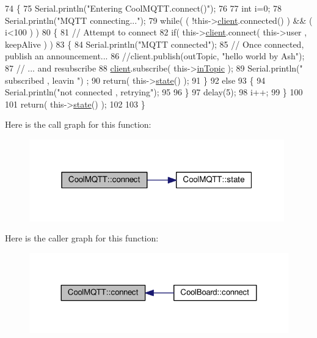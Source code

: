 \begin{DoxyCode}
74 \{       
75     Serial.println(\textcolor{stringliteral}{"Entering CoolMQTT.connect()"});
76 
77     \textcolor{keywordtype}{int} i=0;
78     Serial.println(\textcolor{stringliteral}{"MQTT connecting..."});
79     \textcolor{keywordflow}{while}( ( !this->\hyperlink{classCoolMQTT_a4ca71e4f76ef868692a297efd45b1415}{client}.connected() ) && ( i<100 ) ) 
80     \{
81         \textcolor{comment}{// Attempt to connect}
82         \textcolor{keywordflow}{if}( this->\hyperlink{classCoolMQTT_a4ca71e4f76ef868692a297efd45b1415}{client}.connect( this->user , keepAlive ) ) 
83         \{
84             Serial.println(\textcolor{stringliteral}{"MQTT connected"});
85             \textcolor{comment}{// Once connected, publish an announcement...}
86             \textcolor{comment}{//client.publish(outTopic, "hello world by Ash");}
87             \textcolor{comment}{// ... and resubscribe}
88             \hyperlink{classCoolMQTT_a4ca71e4f76ef868692a297efd45b1415}{client}.subscribe( this->\hyperlink{classCoolMQTT_a4492f52a441e83cc5151010317fdb52d}{inTopic} );
89             Serial.println(\textcolor{stringliteral}{" subscribed , leavin "}) ;
90             \textcolor{keywordflow}{return}( this->\hyperlink{classCoolMQTT_a5d003307eff78efbd585e42b43b72b6d}{state}() );
91         \}
92         \textcolor{keywordflow}{else}
93         \{
94             Serial.println(\textcolor{stringliteral}{"not connected , retrying"});
95             
96         \}
97     delay(5);
98     i++;
99     \}
100     
101     \textcolor{keywordflow}{return}( this->\hyperlink{classCoolMQTT_a5d003307eff78efbd585e42b43b72b6d}{state}() );
102 
103 \}
\end{DoxyCode}
Here is the call graph for this function\+:
\nopagebreak
\begin{figure}[H]
\begin{center}
\leavevmode
\includegraphics[width=313pt]{classCoolMQTT_a58b0b1f64b269c2681685208262fba1d_cgraph}
\end{center}
\end{figure}
Here is the caller graph for this function\+:
\nopagebreak
\begin{figure}[H]
\begin{center}
\leavevmode
\includegraphics[width=324pt]{classCoolMQTT_a58b0b1f64b269c2681685208262fba1d_icgraph}
\end{center}
\end{figure}
